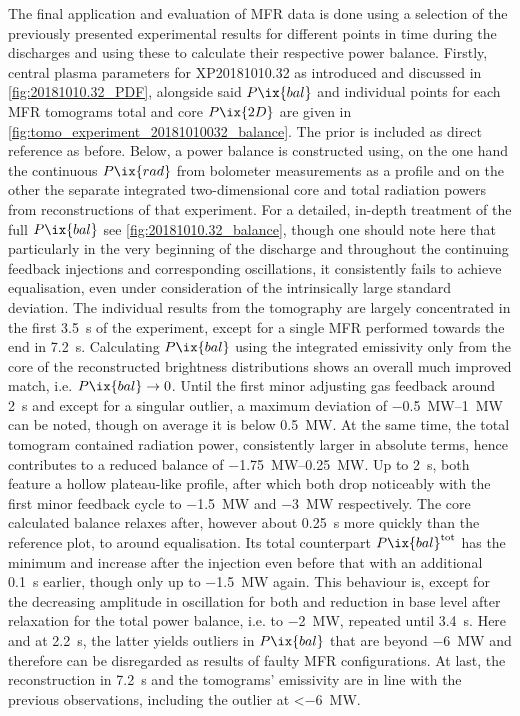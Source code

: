                     The final application and evaluation of MFR data is done using a selection of the previously presented experimental results for different points in time during the discharges and using these to calculate their respective power balance. Firstly, central plasma parameters for XP20181010.32 as introduced and discussed in \cref{fig:20181010.32_PDF}, alongside said $P\ix{bal}$ and individual points for each MFR tomograms total and core $P\ix{2D}$ are given in \cref{fig:tomo_experiment_20181010032_balance}. The prior is included as direct reference as before. Below, a power balance is constructed using, on the one hand the continuous $P\ix{rad}$ from bolometer measurements as a profile and on the other the separate integrated two-dimensional core and total radiation powers from reconstructions of that experiment. For a detailed, in-depth treatment of the full $P\ix{bal}$ see \cref{fig:20181010.32_balance}, though one should note here that particularly in the very beginning of the discharge and throughout the continuing feedback injections and corresponding oscillations, it consistently fails to achieve equalisation, even under consideration of the intrinsically large standard deviation. The individual results from the tomography are largely concentrated in the first \SI{3.5}{\second} of the experiment, except for a single MFR performed towards the end in \SI{7.2}{\second}. Calculating $P\ix{bal}$ using the integrated emissivity only from the core of the reconstructed brightness distributions shows an overall much improved match, i.e. $P\ix{bal}\rightarrow0$. Until the first minor adjusting gas feedback around \SI{2}{\second} and except for a singular outlier, a maximum deviation of \SIrange{-0.5}{1}{\mega\watt} can be noted, though on average it is below \SI{0.5}{\mega\watt}. At the same time, the total tomogram contained radiation power, consistently larger in absolute terms, hence contributes to a reduced balance of \SIrange{-1.75}{0.25}{\mega\watt}. Up to \SI{2}{\second}, both feature a hollow plateau-like profile, after which both drop noticeably with the first minor feedback cycle to \SI{-1.5}{\mega\watt} and \SI{-3}{\mega\watt} respectively. The core calculated balance relaxes after, however about \SI{0.25}{\second} more quickly than the reference plot, to around equalisation. Its total counterpart $P\ix{bal}^{\text{tot}}$ has the minimum and increase after the injection even before that with an additional \SI{0.1}{\second} earlier, though only up to \SI{-1.5}{\mega\watt} again. This behaviour is, except for the decreasing amplitude in oscillation for both and reduction in base level after relaxation for the total power balance, i.e. to \SI{-2}{\mega\watt}, repeated until \SI{3.4}{\second}. Here and at \SI{2.2}{\second}, the latter yields outliers in $P\ix{bal}$ that are beyond \SI{-6}{\mega\watt} and therefore can be disregarded as results of faulty MFR configurations. At last, the reconstruction in \SI{7.2}{\second} and the tomograms' emissivity are in line with the previous observations, including the outlier at <\SI{-6}{\mega\watt}.\\%
